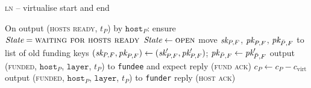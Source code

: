 \begin{center}
\begin{processbox}{\textsc{ln} -- virtualise start and end}
\begin{algorithmic}[1]
      \State On output (\textsc{hosts ready}, $t_P$) by $\texttt{host}_P$:
      \label{code:ln:virtualise:start-end:hosts-ready}
      \Indent
        \State ensure $\itistate = \textsc{waiting for hosts ready}$
        \State $\itistate \gets \textsc{open}$
        \State move $\textit{sk}_{P, F}$, $\textit{pk}_{P, F}$, $\textit{pk}_{\bar{P}, F}$ to list of old
        funding keys
        \State $(\textit{sk}_{P, F}, \textit{pk}_{P, F}) \gets (\textit{sk}_{P, F}', \textit{pk}_{P, F}')$;
        $\textit{pk}_{\bar{P}, F} \gets \textit{pk}_{\bar{P}, F}'$
         
          \State output (\textsc{funded}, $\texttt{host}_P$, $\texttt{layer}$,
          $t_P$) to \texttt{fundee} and expect reply (\textsc{fund ack})
          \label{code:ln:virtualise:start-end:helper-output-funded}
         
          \State $c_P \gets c_P - c_{\mathrm{virt}}$
          \label{code:ln:virtualise:start-end:reduce-coins}
          \State output (\textsc{funded}, $\texttt{host}_P$, $\texttt{layer}$,
          $t_P$) to \texttt{funder} 
          \label{code:ln:virtualise:start-end:funder-funded}
        \EndIf
        \State reply (\textsc{host ack})
        \label{code:ln:virtualise:start-end:reply}
      \EndIndent
    \end{algorithmic}
  \end{processbox}
  \label{code:ln:virtualise:start-end}
\end{center} \ \\

